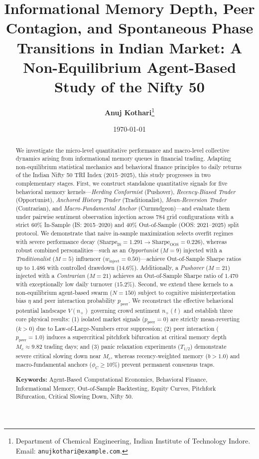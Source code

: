 \documentclass[11pt,a4paper]{article}
\title{\LARGE \textbf{Informational Memory Depth, Peer Contagion, and Spontaneous Phase Transitions in Indian Market: A Non-Equilibrium Agent-Based Study of the Nifty 50}}
\author{
    \textbf{Anuj Kothari}\thanks{Department of Chemical Engineering, Indian Institute of Technology Indore. Email: \texttt{anujkothari@example.com}.}
}
\date{\today}
\begin{document}
\maketitle

\begin{abstract}
\noindent We investigate the micro-level quantitative performance and macro-level collective dynamics arising from informational memory queues in financial trading. Adapting non-equilibrium statistical mechanics and behavioral finance principles to daily returns of the Indian Nifty 50 TRI Index (2015--2025), this study progresses in two complementary stages. First, we construct standalone quantitative signals for five behavioral memory kernels---\emph{Herding Conformist} (Pushover), \emph{Recency-Biased Trader} (Opportunist), \emph{Anchored History Trader} (Traditionalist), \emph{Mean-Reversion Trader} (Contrarian), and \emph{Macro-Fundamental Anchor} (Curmudgeon)---and evaluate them under pairwise sentiment observation injection across 784 grid configurations with a strict 60\% In-Sample (IS: 2015--2020) and 40\% Out-of-Sample (OOS: 2021--2025) split protocol. We demonstrate that naive in-sample maximization selects overfit regimes with severe performance decay ($\text{Sharpe}_{\text{IS}} = 1.291 \to \text{Sharpe}_{\text{OOS}} = 0.226$), whereas robust combined personalities---such as an \emph{Opportunist} ($M=9$) injected with a \emph{Traditionalist} ($M=5$) influencer ($w_{\text{inject}}=0.50$)---achieve Out-of-Sample Sharpe ratios up to $1.486$ with controlled drawdown ($14.6\%$). Additionally, a \emph{Pushover} ($M=21$) injected with a \emph{Contrarian} ($M=21$) achieves an Out-of-Sample Sharpe ratio of $1.470$ with exceptionally low daily turnover ($15.2\%$). Second, we extend these kernels to a non-equilibrium agent-based swarm ($N=150$) subject to cognitive misinterpretation bias $\eta$ and peer interaction probability $p_{\text{peer}}$. We reconstruct the effective behavioral potential landscape $V(n_+)$ governing crowd sentiment $n_+(t)$ and establish three core physical results: (1) isolated market signals ($p_{\text{peer}}=0$) are strictly mean-reverting ($k>0$) due to Law-of-Large-Numbers error suppression; (2) peer interaction ($p_{\text{peer}}=1.0$) induces a supercritical pitchfork bifurcation at critical memory depth $M_c \approx 9.82$ trading days; and (3) panic relaxation experiments ($T_{1/2}$) demonstrate severe critical slowing down near $M_c$, whereas recency-weighted memory ($b>1.0$) and macro-fundamental anchors ($\phi_C \ge 10\%$) prevent permanent consensus traps.

\vspace{0.3cm}
\noindent \textbf{Keywords:} Agent-Based Computational Economics, Behavioral Finance, Informational Memory, Out-of-Sample Backtesting, Equity Curves, Pitchfork Bifurcation, Critical Slowing Down, Nifty 50.
\end{abstract}
\end{document}
